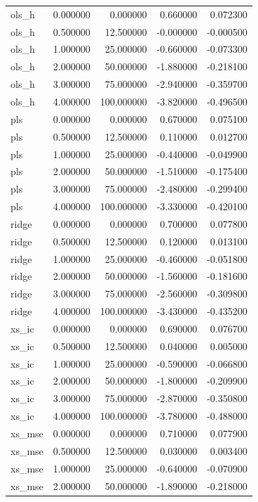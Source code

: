 \begin{table}
\begin{tabular}{lrrrr}
ols\_h & 0.000000 & 0.000000 & 0.660000 & 0.072300 \\
ols\_h & 0.500000 & 12.500000 & -0.000000 & -0.000500 \\
ols\_h & 1.000000 & 25.000000 & -0.660000 & -0.073300 \\
ols\_h & 2.000000 & 50.000000 & -1.880000 & -0.218100 \\
ols\_h & 3.000000 & 75.000000 & -2.940000 & -0.359700 \\
ols\_h & 4.000000 & 100.000000 & -3.820000 & -0.496500 \\
pls & 0.000000 & 0.000000 & 0.670000 & 0.075100 \\
pls & 0.500000 & 12.500000 & 0.110000 & 0.012700 \\
pls & 1.000000 & 25.000000 & -0.440000 & -0.049900 \\
pls & 2.000000 & 50.000000 & -1.510000 & -0.175400 \\
pls & 3.000000 & 75.000000 & -2.480000 & -0.299400 \\
pls & 4.000000 & 100.000000 & -3.330000 & -0.420100 \\
ridge & 0.000000 & 0.000000 & 0.700000 & 0.077800 \\
ridge & 0.500000 & 12.500000 & 0.120000 & 0.013100 \\
ridge & 1.000000 & 25.000000 & -0.460000 & -0.051800 \\
ridge & 2.000000 & 50.000000 & -1.560000 & -0.181600 \\
ridge & 3.000000 & 75.000000 & -2.560000 & -0.309800 \\
ridge & 4.000000 & 100.000000 & -3.430000 & -0.435200 \\
xs\_ic & 0.000000 & 0.000000 & 0.690000 & 0.076700 \\
xs\_ic & 0.500000 & 12.500000 & 0.040000 & 0.005000 \\
xs\_ic & 1.000000 & 25.000000 & -0.590000 & -0.066800 \\
xs\_ic & 2.000000 & 50.000000 & -1.800000 & -0.209900 \\
xs\_ic & 3.000000 & 75.000000 & -2.870000 & -0.350800 \\
xs\_ic & 4.000000 & 100.000000 & -3.780000 & -0.488000 \\
xs\_mse & 0.000000 & 0.000000 & 0.710000 & 0.077900 \\
xs\_mse & 0.500000 & 12.500000 & 0.030000 & 0.003400 \\
xs\_mse & 1.000000 & 25.000000 & -0.640000 & -0.070900 \\
xs\_mse & 2.000000 & 50.000000 & -1.890000 & -0.218000 \\

\end{tabular}
\end{table}
